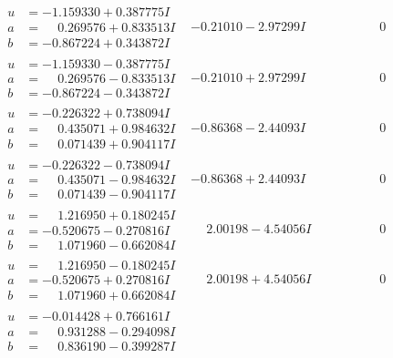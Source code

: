 \documentclass[1p]{elsarticle_modified}
\theoremstyle{definition}
\begin{document}
$$\begin{array}{c|c|c}
\begin{aligned}
u &= -1.159330 + 0.387775 I \\
a &= \phantom{-}0.269576 + 0.833513 I \\
b &= -0.867224 + 0.343872 I\end{aligned}
 & -0.21010 - 2.97299 I & \phantom{-0.000000 } 0 \\ \hline\begin{aligned}
u &= -1.159330 - 0.387775 I \\
a &= \phantom{-}0.269576 - 0.833513 I \\
b &= -0.867224 - 0.343872 I\end{aligned}
 & -0.21010 + 2.97299 I & \phantom{-0.000000 } 0 \\ \hline\begin{aligned}
u &= -0.226322 + 0.738094 I \\
a &= \phantom{-}0.435071 + 0.984632 I \\
b &= \phantom{-}0.071439 + 0.904117 I\end{aligned}
 & -0.86368 - 2.44093 I & \phantom{-0.000000 } 0 \\ \hline\begin{aligned}
u &= -0.226322 - 0.738094 I \\
a &= \phantom{-}0.435071 - 0.984632 I \\
b &= \phantom{-}0.071439 - 0.904117 I\end{aligned}
 & -0.86368 + 2.44093 I & \phantom{-0.000000 } 0 \\ \hline\begin{aligned}
u &= \phantom{-}1.216950 + 0.180245 I \\
a &= -0.520675 - 0.270816 I \\
b &= \phantom{-}1.071960 - 0.662084 I\end{aligned}
 & \phantom{-}2.00198 - 4.54056 I & \phantom{-0.000000 } 0 \\ \hline\begin{aligned}
u &= \phantom{-}1.216950 - 0.180245 I \\
a &= -0.520675 + 0.270816 I \\
b &= \phantom{-}1.071960 + 0.662084 I\end{aligned}
 & \phantom{-}2.00198 + 4.54056 I & \phantom{-0.000000 } 0 \\ \hline\begin{aligned}
u &= -0.014428 + 0.766161 I \\
a &= \phantom{-}0.931288 - 0.294098 I \\
b &= \phantom{-}0.836190 - 0.399287 I\end{aligned}

\end{array}$$
\end{document}
